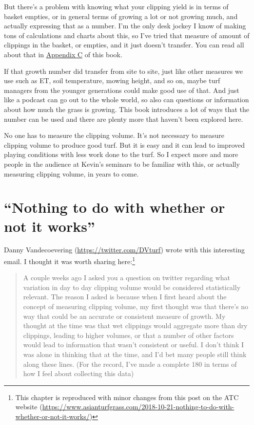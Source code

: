 \documentclass[12pt,b5,]{tufte-book}
\begin{document}
But there's a problem with knowing what your clipping yield is in terms of basket empties, or in general terms of growing a lot or not growing much, and actually expressing that as a number. I'm the only desk jockey I know of making tons of calculations and charts about this, so I've tried that measure of amount of clippings in the basket, or empties, and it just doesn't transfer. You can read all about that in \protect\hyperlink{report2014}{Appendix C} of this book.

If that growth number did transfer from site to site, just like other measures we use such as ET, soil temperature, mowing height, and so on, maybe turf managers from the younger generations could make good use of that. And just like a podcast can go out to the whole world, so also can questions or information about how much the grass is growing. This book introduces a lot of ways that the number can be used and there are plenty more that haven't been explored here.

No one has to measure the clipping volume. It's not necessary to measure clipping volume to produce good turf. But it is easy and it can lead to improved playing conditions with less work done to the turf. So I expect more and more people in the audience at Kevin's seminars to be familiar with this, or actually measuring clipping volume, in years to come.

\hypertarget{nothing-to-do-with-whether-or-not-it-works}{%
\chapter{``Nothing to do with whether or not it works''}\label{nothing-to-do-with-whether-or-not-it-works}}

Danny Vandecoevering (\url{https://twitter.com/DVturf}) wrote with this interesting email. I thought it was worth sharing here:\footnote{This chapter is reproduced with minor changes from this post on the ATC website (\url{https://www.asianturfgrass.com/2018-10-21-nothing-to-do-with-whether-or-not-it-works/})}

\begin{quote}
A couple weeks ago I asked you a question on twitter regarding what variation in day to day clipping volume would be considered statistically relevant. The reason I asked is because when I first heard about the concept of measuring clipping volume, my first thought was that there's no way that could be an accurate or consistent measure of growth. My thought at the time was that wet clippings would aggregate more than dry clippings, leading to higher volumes, or that a number of other factors would lead to information that wasn't consistent or useful. I don't think I was alone in thinking that at the time, and I'd bet many people still think along these lines. (For the record, I've made a complete 180 in terms of how I feel about collecting this data)
\end{quote}
\end{document}
